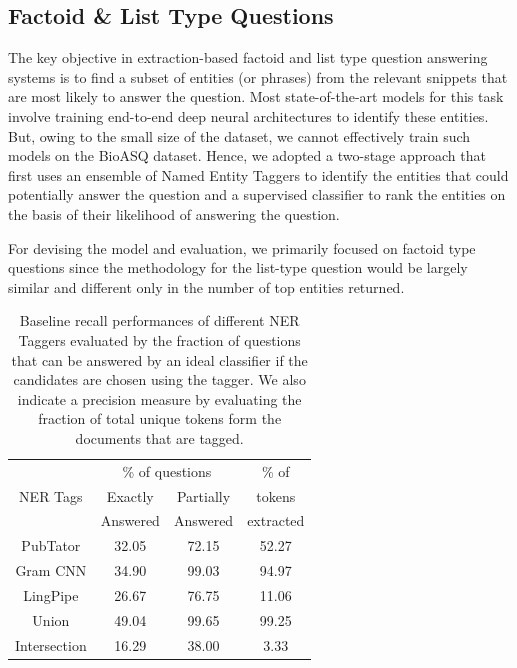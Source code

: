 \documentclass[11pt,a4paper]{article}
\begin{document}
\subsection{Factoid \& List Type Questions}

The key objective in extraction-based factoid and list type question answering systems is to find a subset of entities (or phrases) from the relevant snippets that are most likely to answer the question. Most state-of-the-art models for this task involve training end-to-end deep neural architectures to identify these entities. But, owing to the small size of the dataset, we cannot effectively train such models on the BioASQ dataset. Hence, we adopted a two-stage approach that first uses an ensemble of Named Entity Taggers to identify the entities that could potentially answer the question and a supervised classifier to rank the entities on the basis of their likelihood of answering the question.

For devising the model and evaluation, we primarily focused on factoid type questions since the methodology for the list-type question would be largely similar and different only in the number of top entities returned. 

\begin{table}[h]
    \centering
    \begin{tabular}{cccc} \hline
    \multirow{3}{*}{NER Tags} & 
    \multicolumn{2}{c}{\% of questions} & 
     \% of \\
    & Exactly & Partially & tokens \\
    & Answered & Answered & extracted \\ \hline
    PubTator & 32.05 &	72.15 & 52.27 \\
    Gram CNN & 34.90 &	99.03 & 94.97 \\
    LingPipe & 26.67 &	76.75 & 11.06 \\
    Union    & 49.04 &	99.65 & 99.25 \\
    Intersection & 16.29 &	38.00 & 3.33 \\ \hline
    \end{tabular}
    \caption{Baseline recall performances of different NER Taggers evaluated by the fraction of questions that can be answered by an ideal classifier if the candidates are chosen using the tagger. We also indicate a precision measure by evaluating the fraction of total unique tokens form the documents that are tagged.}
    \label{tab:NER_tagging_performances}
\end{table}
\end{document}
